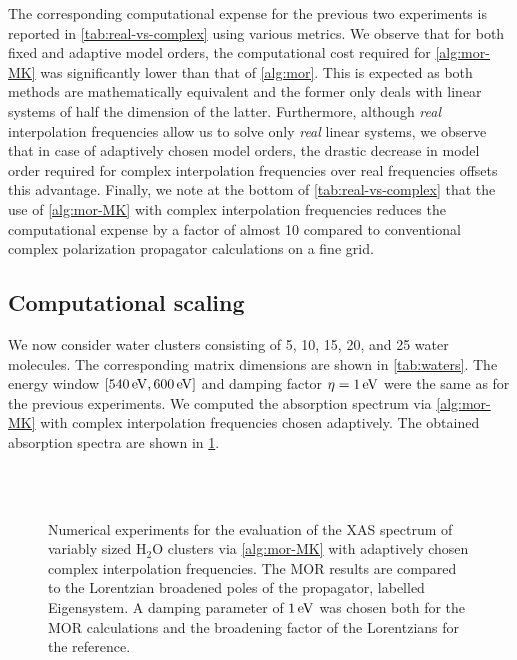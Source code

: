 The corresponding computational expense for the previous two experiments is reported in \cref{tab:real-vs-complex} using various metrics. We observe that for both fixed and adaptive model orders, the computational cost required for \cref{alg:mor-MK} was significantly lower than that of \cref{alg:mor}. This is expected as both methods are mathematically equivalent and the former only deals with linear systems of half the dimension of the latter. Furthermore, although \emph{real} interpolation frequencies allow us to solve only \emph{real} linear systems, we observe that in case of adaptively chosen model orders, the drastic decrease in model order required for complex interpolation frequencies over real frequencies offsets this advantage. Finally, we note at the bottom of \cref{tab:real-vs-complex} that the use of \cref{alg:mor-MK} with complex interpolation frequencies reduces the computational expense by a factor of almost 10 compared to conventional complex polarization propagator calculations on a fine grid.

\subsection{Computational scaling}
\label{sec:MORresults-scaling}

We now consider water clusters consisting of 5, 10, 15, 20, and 25 water molecules. The corresponding matrix dimensions are shown in \cref{tab:waters}. The energy window $[540\,\mathrm{eV},600\,\mathrm{eV}]$ and damping factor $\eta = 1\,\mathrm{eV}$ were the same as for the previous experiments. We computed the absorption spectrum via \cref{alg:mor-MK} with complex interpolation frequencies chosen adaptively. The obtained absorption spectra are shown in \cref{fig:water}.

\begin{figure}[hbtp]
\centering
{}%
%
\\[10pt]
%
%
%
\\[10pt]
\caption{Numerical experiments for the evaluation of the XAS spectrum of variably sized
H$_2$O clusters via \cref{alg:mor-MK} with adaptively chosen complex interpolation
frequencies. The MOR results are compared to the Lorentzian broadened poles of the
propagator, labelled Eigensystem. A damping parameter of $1\,\mathrm{eV}$ was chosen both
for the MOR calculations and the broadening factor of the Lorentzians for the
reference.}
\label{fig:water}
\end{figure}

